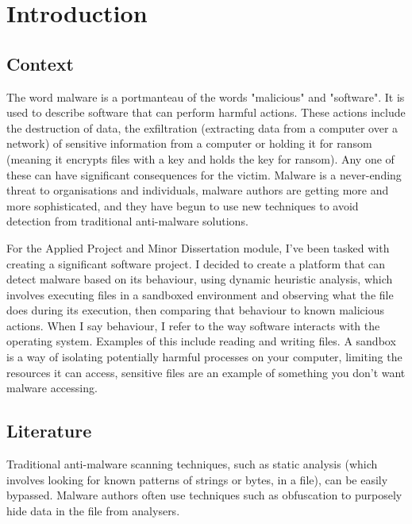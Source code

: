 \chapter{Introduction}

\section{Context}
The word malware is a portmanteau of the words "malicious" and "software".
It is used to describe software that can perform harmful actions.
These actions include the destruction of data,
the exfiltration (extracting data from a computer over a network)
of sensitive information from a computer or
holding it for ransom (meaning it encrypts files with a key and holds the key for ransom).
Any one of these can have significant consequences for the victim.
Malware is a never-ending threat to organisations and individuals,
malware authors are getting more and more sophisticated,
and they have begun to use new techniques to avoid detection
from traditional anti-malware solutions.

For the Applied Project and Minor Dissertation module,
I've been tasked with creating a significant software project.
I decided to create a platform that can detect malware based on its behaviour,
using dynamic heuristic analysis, which involves executing files
in a sandboxed environment and observing what the file does during its execution,
then comparing that behaviour to known malicious actions.
When I say behaviour, I refer to the way
software interacts with the operating system.
Examples of this include reading and writing files.
A sandbox is a way of isolating potentially harmful processes on your computer,
limiting the resources it can access,
sensitive files are an example of something you don't want malware accessing.

\section{Literature}
Traditional anti-malware scanning techniques, such as static analysis
(which involves looking for known patterns of strings or bytes, in a file),
can be easily bypassed. Malware authors often use techniques such as obfuscation
\cite{4413008} to purposely hide data in the file from analysers.

